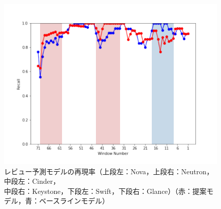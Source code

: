 \documentclass[submit]{ipsj}
\begin{document}
\begin{figure}[t]
\begin{minipage}[b]{0.65\columnwidth}
    \includegraphics[width=1\columnwidth]{Uenaka_fig/RQ2_result/Glance/Glance_review_Recall.pdf}
\end{minipage}
    \caption{レビュー予測モデルの再現率（上段左：Nova，上段右：Neutron，中段左：Cinder，\\ 中段右：Keystone，下段左：Swift，下段右：Glance）（赤：提案モデル，青：ベースラインモデル）}
    \label{fig:review_p}
\end{figure}

\end{document}
